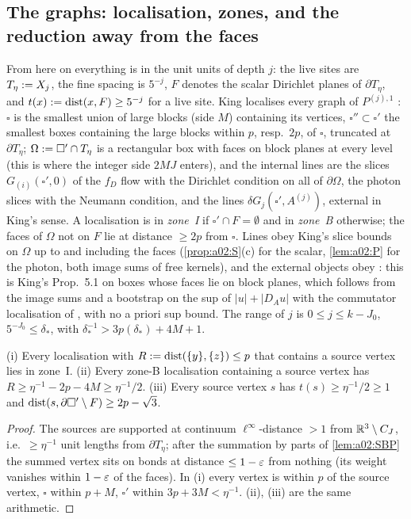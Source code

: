 \subsection{The graphs: localisation, zones, and the reduction away from the faces}\label{ssec:a02:zones}

From here on everything is in the unit units of depth $j$: the live sites are $T_\eta:= X_j$, the fine spacing is $5^{-j}$, $F$ denotes the scalar Dirichlet planes of $\partial T_\eta$, and $t(x):=\operatorname{dist}(x,F)\ge5^{-j}$ for a live site. King localises every graph of $P^{(j),1}$ \cite[p.~661]{K1}: $\square$ is the smallest union of large blocks (side $M$) containing its vertices, $\square''\subset\square'$ the smallest boxes containing the large blocks within $p$, resp.\ $2p$, of $\square$, truncated at $\partial T_\eta$; $\Omega:=\square'\cap T_\eta$ is a rectangular box with faces on block planes at every level (this is where the integer side $2MJ$ enters), and the internal lines are the slices $G_{(i)}(\square',0)$ of the $f_D$ flow with the Dirichlet condition on all of $\partial\Omega$, the photon slices with the Neumann condition, and the lines $\delta G_j(\square',A^{(j)})$, external in King's sense. A localisation is in \emph{zone~I} if $\square'\cap F=\emptyset$ and in \emph{zone~B} otherwise; the faces of $\Omega$ not on $F$ lie at distance $\ge2p$ from $\square$. Lines obey King's slice bounds \cite[(3.63)--(3.65)]{K1} on $\Omega$ up to and including the faces (\cref{prop:a02:S}(c) for the scalar, \cref{lem:a02:P} for the photon, both image sums of free kernels), and the external objects obey \cite[(5.2)--(5.3)]{K2}: this is King's Prop.~5.1 on boxes whose faces lie on block planes, which follows from the image sums and a bootstrap on the sup of $|u|+|D_Au|$ with the commutator localisation of \cite[Lemma~5.3]{K2}, with no a priori sup bound. The range of $j$ is $0\le j\le k-J_0$, $5^{-J_0}\le\delta_*$, with $\delta_*^{-1}>3p(\delta_*)+4M+1$.

\begin{lemma}[zones]\label{lem:a02:Z}
(i) Every localisation with $R:=\operatorname{dist}(\{y\},\{z\})\le p$ that contains a source vertex lies in zone~I. (ii) Every zone-B localisation containing a source vertex has $R\ge\eta^{-1}-2p-4M\ge\eta^{-1}/2$. (iii) Every source vertex $s$ has $t(s)\ge\eta^{-1}/2\ge1$ and $\operatorname{dist}(s,\partial\square'\setminus F)\ge2p-\sqrt3$.
\end{lemma}
\begin{proof}
The sources are supported at continuum $\ell^\infty$-distance $>1$ from $\mathbb R^3\setminus C_J$, i.e.\ $\ge\eta^{-1}$ unit lengths from $\partial T_\eta$; after the summation by parts of \cref{lem:a02:SBP} the summed vertex sits on bonds at distance $\le1-\varepsilon$ from nothing (its weight vanishes within $1-\varepsilon$ of the faces). In (i) every vertex is within $p$ of the source vertex, $\square$ within $p+M$, $\square'$ within $3p+3M<\eta^{-1}$. (ii), (iii) are the same arithmetic.
\end{proof}

